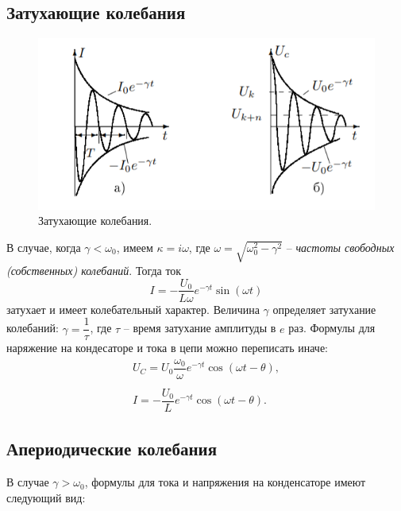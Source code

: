 \documentclass[a4paper,12pt]{report}
\begin{document}
\subsection*{Затухающие колебания}
\begin{figure}
\includegraphics[scale=0.6]{3.png}
\caption{Затухающие колебания.}
\vspace{-30pt}
\end{figure}
 В случае, когда $\gamma < \omega_0$, имеем $\kappa = i\omega$, где $\omega = \sqrt{\omega_0^2 - \gamma^2}$ -- \textit{частоты свободных (собственных) колебаний}. Тогда ток
 \begin{equation}
 I = -\dfrac{U_0}{L\omega}e^{-\gamma t}\sin(\omega t)
 \end{equation}
 затухает и имеет колебательный характер. Величина $\gamma$ определяет затухание колебаний: $\gamma = \dfrac{1}{\tau}$, где $\tau$ -- время затухание амплитуды в $e$ раз.
Формулы для наряжение на кондесаторе и тока в цепи можно переписать иначе:
\begin{equation}
\begin{array}{c}
U_C = U_0 \dfrac{\omega_0}{\omega}e^{-\gamma t} \cos(\omega t - \theta),\\
\\
I = -\dfrac{U_0}{L}e^{-\gamma t} \cos(\omega t - \theta).
\end{array}
\end{equation}
\subsection*{Апериодические колебания}
В случае $\gamma > \omega_0$, формулы для тока и напряжения на конденсаторе имеют следующий вид:
\end{document}
